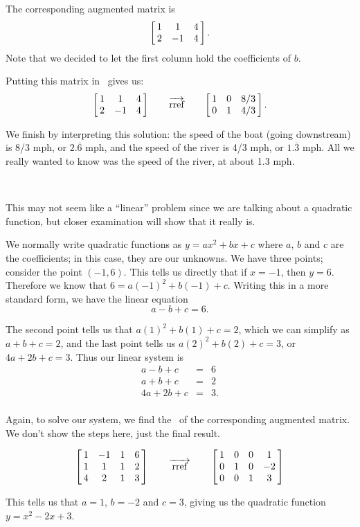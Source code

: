 {%

The corresponding augmented matrix is $$\bmx{ccc} 1 & 1 & 4\\ 2&-1&4\\ \emx.$$ Note that we decided to let the first column hold the coefficients of $b$.

Putting this matrix in \rref\ gives us: $$\bmx{ccc} 1 & 1 & 4\\ 2&-1&4\\ \emx\quad\quad\overrightarrow{\text{rref}}\quad\quad\bmx{ccc}1&0&8/3\\0&1&4/3\\ \emx.$$

We finish by interpreting this solution: the speed of the boat (going downstream) is 8/3 mph, or $2.\overline{6}$ mph, and the speed of the river is 4/3 mph, or $1.\overline{3}$ mph. All we really wanted to know was the speed of the river, at about 1.3 mph.}\\ %


{This may not seem like a ``linear'' problem since we are talking about a quadratic function, but closer examination will show that it really is.

We normally write quadratic functions as $y=ax^2+bx+c$ where $a$, $b$ and $c$ are the coefficients; in this case, they are our unknowns. We have three points; consider the point $(-1,6)$. This tells us directly that if $x=-1$, then $y=6$. Therefore we know that $6=a(-1)^2+b(-1)+c$. Writing this in a more standard form, we have the linear equation $$a - b+c=6.$$

The second point tells us that $a(1)^2+b(1)+c = 2$, which we can simplify as $a+b+c=2$, and the last point tells us $a(2)^2+b(2)+c = 3$, or $4a+2b+c=3$. Thus our linear system is $$\begin{array}{rcl} a-b+c&=&6\\ a+b+c&=&2\\ 4a+2b+c&=&3.\\ \end{array}$$ 

Again, to solve our system, we find the \rref\ of the corresponding augmented matrix. We don't show the steps here, just the final result.

$$\bmx{cccc}1&-1&1&6\\1&1&1&2\\4&2&1&3\\ \emx \quad\quad \overrightarrow{\text{ rref }}\quad\quad \bmx{cccc}1&0&0&1\\0&1&0&-2\\0&0&1&3\\ \emx$$

This tells us that $a=1$, $b=-2$ and $c=3$, giving us the quadratic function $y=x^2-2x+3$.}\\ %

